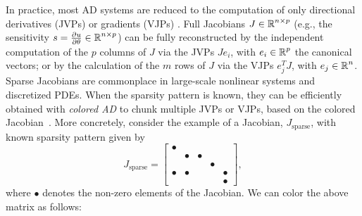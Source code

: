 In practice, most AD systems are reduced to the computation of only directional derivatives (JVPs) or gradients (VJPs) \cite{Griewank:2008kh}.
Full Jacobians $J \in \operatorname{\mathbb{R}}^{n \times p}$ (e.g., the sensitivity $s = \frac{\partial u}{\partial \theta} \in \operatorname{\mathbb{R}}^{n \times p}$) can be fully reconstructed by the independent computation of the $p$ columns of $J$ via the JVPs $J e_i$, with $e_i \in \operatorname{\mathbb{R}}^p$ the canonical vectors; or by the calculation of the $m$ rows of $J$ via the VJPs $e_j^T J$, with $e_j \in \operatorname{\mathbb{R}}^n$.
Sparse Jacobians are commonplace in large-scale nonlinear systems and discretized PDEs. %
When the sparsity pattern is known, they can be efficiently obtained with \textit{colored AD} to chunk multiple JVPs or VJPs, based on the colored Jacobian~\cite{gebremedhin2005color}.
More concretely, consider the example of a Jacobian, ${J}_{\text{sparse}}$, with known sparsity pattern given by
\begin{equation}
    {J}_{\text{sparse}} = \begin{bmatrix}
        \bullet &         &         &         &         \\
                & \bullet & \bullet &         &         \\
                &         &         & \bullet &         \\
        \bullet & \bullet &         &         & \bullet \\
                &         &         &         & \bullet
    \end{bmatrix},
\end{equation}
where $\bullet$ denotes the non-zero elements of the Jacobian. 
We can color the above matrix as follows: %
